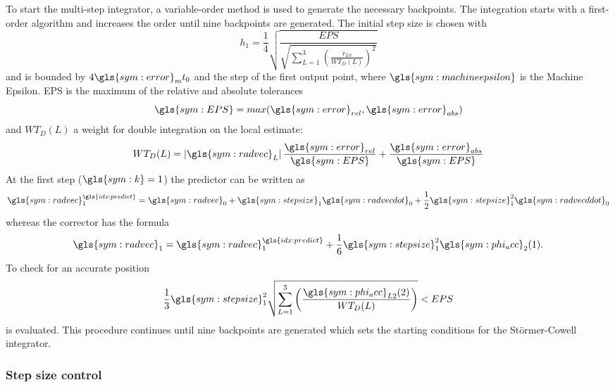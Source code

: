 To start the multi-step integrator, a variable-order method is used to generate the necessary backpoints. The integration starts with a first-order algorithm and increases the order until nine backpoints are generated. The initial step size is chosen with 
\begin{equation}
h_1 = \frac{1}{4}\sqrt{\frac{EPS}{\sqrt{\sum\limits_{L=1}^{3}\left(\frac{\dot r_{L0}}{WT_D(L)}\right)^{2}}}}
\end{equation}
and is bounded by $4\gls{sym:error}_{m}t_{0}$ and the step of the first output point, where $\gls{sym:machineepsilon}$ is the Machine Epsilon. EPS is the maximum of the relative and absolute tolerances
\begin{equation}
 \gls{sym:EPS} = max(\gls{sym:error}_{rel},\gls{sym:error}_{abs})
\end{equation}
and $WT_D(L)$ a weight for double integration on the local estimate:
\begin{equation}
 WT_D(L) = \left| \gls{sym:radvec}_{L}\right| \frac{\gls{sym:error}_{rel}}{\gls{sym:EPS}}+\frac{\gls{sym:error}_{abs}}{\gls{sym:EPS}}
\end{equation}
At the first step ($\gls{sym:k} = 1$) the predictor can be written as
\begin{equation}
 \gls{sym:radvec}_{1}^{\gls{idx:predict}} = \gls{sym:radvec}_{0} + \gls{sym:stepsize}_{1}\gls{sym:radvecdot}_{0} + \frac{1}{2}\gls{sym:stepsize}_{1}^{2}\gls{sym:radvecddot}_{0}
\end{equation}
whereas the corrector has the formula
\begin{equation}
 \gls{sym:radvec}_{1} = \gls{sym:radvec}_{1}^{\gls{idx:predict}} + \frac{1}{6}\gls{sym:stepsize}_{1}^{2}\gls{sym:phi_acc}_{2}(1).
\end{equation}
To check for an accurate position
\begin{equation}
 \frac{1}{3}\gls{sym:stepsize}_{1}^{2}\sqrt{\sum\limits_{L=1}^{3}\left(\frac{\gls{sym:phi_acc}_{L2}(2)}{WT_D(L)}\right)} < EPS
\end{equation}
is evaluated. This procedure continues until nine backpoints are generated which sets the starting conditions for the St\"ormer-Cowell integrator.

\subsubsection{Step size control}
\label{sec:propagation-state-integration-stepsize}

